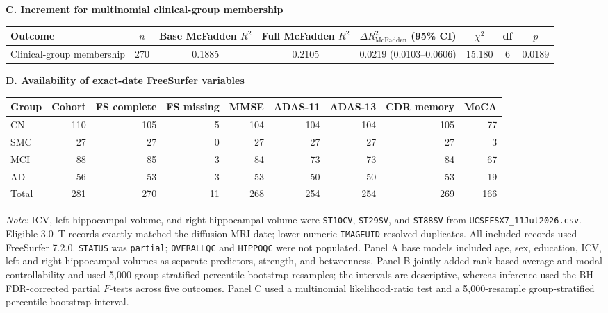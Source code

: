 \documentclass{article}
\begin{document}
\begin{table}[!htbp]
\vspace{3mm}
\textbf{C. Increment for multinomial clinical-group membership}

\vspace{1mm}
\begin{tabular}{@{}lccccccc@{}}
\toprule
\textbf{Outcome} & \textbf{$n$} & \textbf{Base McFadden $R^2$} & \textbf{Full McFadden $R^2$} &
\textbf{$\Delta R^{2}_{\mathrm{McFadden}}$ (95\% CI)} & \textbf{$\chi^2$} & \textbf{df} & \textbf{$p$}\\
\midrule
Clinical-group membership & 270 & 0.1885 & 0.2105 & 0.0219 (0.0103--0.0606) & 15.180 & 6 & 0.0189 \\
\bottomrule
\end{tabular}

\vspace{3mm}
\textbf{D. Availability of exact-date FreeSurfer variables}\par\vspace{1mm}
\begin{tabular}{@{}lrrrrrrrr@{}}
\toprule
\textbf{Group} & \textbf{Cohort} & \textbf{FS complete} & \textbf{FS missing} & \textbf{MMSE} & \textbf{ADAS-11} & \textbf{ADAS-13} & \textbf{CDR memory} & \textbf{MoCA} \\
\midrule
CN & 110 & 105 & 5 & 104 & 104 & 104 & 105 & 77 \\
SMC & 27 & 27 & 0 & 27 & 27 & 27 & 27 & 3 \\
MCI & 88 & 85 & 3 & 84 & 73 & 73 & 84 & 67 \\
AD & 56 & 53 & 3 & 53 & 50 & 50 & 53 & 19 \\
Total & 281 & 270 & 11 & 268 & 254 & 254 & 269 & 166 \\
\bottomrule
\end{tabular}

\vspace{1mm}
\footnotesize{\textit{Note:} ICV, left hippocampal volume, and right hippocampal volume were \texttt{ST10CV}, \texttt{ST29SV}, and \texttt{ST88SV} from \texttt{UCSFFSX7\_11Jul2026.csv}. Eligible 3.0~T records exactly matched the diffusion-MRI date; lower numeric \texttt{IMAGEUID} resolved duplicates. All included records used FreeSurfer 7.2.0. \texttt{STATUS} was \texttt{partial}; \texttt{OVERALLQC} and \texttt{HIPPOQC} were not populated. Panel A base models included age, sex, education, ICV, left and right hippocampal volumes as separate predictors, strength, and betweenness. Panel B jointly added rank-based average and modal controllability and used 5,000 group-stratified percentile bootstrap resamples; the intervals are descriptive, whereas inference used the BH-FDR-corrected partial \(F\)-tests across five outcomes. Panel C used a multinomial likelihood-ratio test and a 5,000-resample group-stratified percentile-bootstrap interval.}

\end{table}
\end{document}
